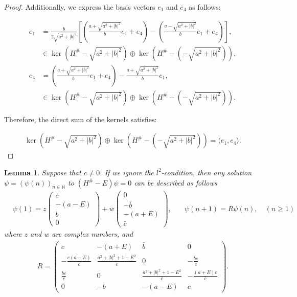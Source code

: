 \documentclass{amsart}
\newtheorem{lem}[thm]{Lemma}
\theoremstyle{definition}
\theoremstyle{remark}
\begin{document}
\begin{proof}
Additionally, we express the basis vectors \(e_1\) and \(e_4\) as follows:

\begin{align*}
e_1 &= \frac{b}{2\sqrt{a^2 + |b|^2}} \left[ \left( \frac{a + \sqrt{a^2 + |b|^2}}{b} e_1 + e_4 \right) - \left( \frac{a - \sqrt{a^2 + |b|^2}}{b} e_1 + e_4 \right) \right], \\
&\in \ker(H^\# - \sqrt{a^2 + |b|^2}) \oplus \ker(H^\# - (-\sqrt{a^2 + |b|^2})), \\
e_4 &= \left( \frac{a + \sqrt{a^2 + |b|^2}}{b} e_1 + e_4 \right) - \frac{a + \sqrt{a^2 + |b|^2}}{b} e_1, \\
&\in \ker(H^\# - \sqrt{a^2 + |b|^2}) \oplus \ker(H^\# - (-\sqrt{a^2 + |b|^2})).
\end{align*}

Therefore, the direct sum of the kernels satisfies:

\begin{align*}
\ker(H^\# - \sqrt{a^2 + |b|^2}) \oplus \ker(H^\# - (-\sqrt{a^2 + |b|^2})) = \langle e_1, e_4 \rangle.
\end{align*}
\end{proof}

\begin{lem}\label{lem:6.3}
Suppose that \(c \neq 0\). If we ignore the \(l^2\)-condition, then any solution \(\psi = (\psi(n))_{n \in \mathbb{N}}\) to \((H^\# - E)\psi = 0\) can be described as follows
\begin{align*}
&\psi(1) = z \begin{pmatrix} \bar{c} \\ -(a - E) \\ b \\ 0 \end{pmatrix} + w \begin{pmatrix} 0 \\ -\bar{b} \\ -(a + E) \\ \bar{c} \end{pmatrix},\quad &\psi(n + 1) = R \psi(n),\quad (n \geq 1)
\end{align*}
where \(z\) and \(w\) are complex numbers, and
\begin{align*}
R = \begin{pmatrix}
c & -(a + E) & \bar{b} & 0 \\
-\frac{c (a - E)}{\bar{c}} & \frac{a^2 + |b|^2 + 1 - E^2}{\bar{c}} & 0 & -\frac{\bar{b} c}{\bar{c}} \\
\frac{b c}{\bar{c}} & 0 & \frac{a^2 + |b|^2 + 1 - E^2}{\bar{c}} & -\frac{(a + E) c}{\bar{c}} \\
0 & -b & -(a - E) & c
\end{pmatrix}.
\end{align*}
\end{lem}
\end{document}
